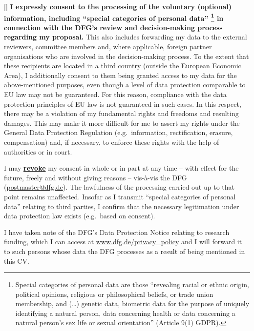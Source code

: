 \documentclass{scrartcl}
\begin{document}
[\hspace{1em}]
\textbf{I expressly consent to the processing of the voluntary (optional) information, including ``special categories of personal data''%
\footnote{Special categories of personal data are those ``revealing racial or ethnic origin, political opinions, religious or philosophical beliefs, or trade union membership, and (\dots) genetic data, biometric data for the purpose of uniquely identifying a natural person, data concerning health or data concerning a natural person's sex life or sexual orientation'' (Article 9(1) GDPR).
} in connection with the DFG's review and decision-making process regarding my proposal.}
This also includes forwarding my data to the external reviewers, committee members and, where applicable, foreign partner organisations who are involved in the decision-making process.
To the extent that these recipients are located in a third country (outside the European Economic Area), I additionally consent to them being granted access to my data for the above-mentioned purposes, even though a level of data protection comparable to EU law may not be guaranteed.
For this reason, compliance with the data protection principles of EU law is not guaranteed in such cases.
In this respect, there may be a violation of my fundamental rights and freedoms and resulting damages.
This may make it more difficult for me to assert my rights under the General Data Protection Regulation (e.g.\ information, rectification, erasure, compensation) and, if necessary, to enforce these rights with the help of authorities or in court.

I may \textbf{\underline{revoke}} my consent in whole or in part at any time -- with effect for the future, freely and without giving reasons -- vis-à-vis the DFG (\href{mailto:postmaster@dfg.de}{postmaster@dfg.de}).
The lawfulness of the processing carried out up to that point remains unaffected.
Insofar as I transmit ``special categories of personal data'' relating to third parties, I confirm that the necessary legitimation under data protection law exists (e.g.\ based on consent).

I have taken note of the DFG's Data Protection Notice relating to research funding, which I can access at \href{https://www.dfg.de/privacy_policy}{www.dfg.de/privacy\_policy} and I will forward it to such persons whose data the DFG processes as a result of being mentioned in this CV.\@
\end{document}
